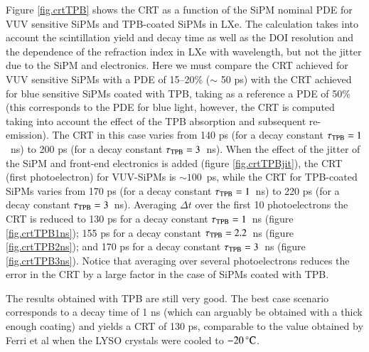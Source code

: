 \documentclass[review]{elsarticle}
\begin{document}
Figure \ref{fig.crtTPB} shows the CRT as a function of the
 SiPM nominal PDE for VUV sensitive SiPMs and TPB-coated SiPMs in LXe. 
 The calculation takes into account the scintillation yield and decay time as well as the DOI resolution and the dependence of the refraction index in LXe with wavelength, but not the jitter due to the SiPM and electronics. 
 Here we must compare the CRT achieved for VUV sensitive SiPMs with a PDE of 15--20\% ($\sim$ 50 ps) with the CRT achieved for blue sensitive SiPMs coated with TPB, taking as a reference a PDE of 50\% (this corresponds to the
 PDE for blue light,  however, the CRT is computed taking into account the effect of the TPB absorption and subsequent re-emission).  The CRT in this case varies from 140 ps (for a decay constant $\tau_{\rm{TPB}} = 1$~ns) to 
 200 ps (for a decay constant $\tau_{\rm{TPB}} = 3$~ns).  When the effect of the jitter of the SiPM and front-end electronics is added (figure \ref{fig.crtTPBjit}), the CRT (first photoelectron) for VUV-SiPMs is $\sim 100$~ps, while the CRT for TPB-coated SiPMs varies from
 170 ps (for a decay constant $\tau_{\rm{TPB}} = 1$~ns) to 
 220 ps (for a decay constant $\tau_{\rm{TPB}} = 3$~ns). Averaging $\Delta t$ over the first 10 photoelectrons 
 the CRT is reduced to 130 ps for a decay constant $\tau_{\rm{TPB}} = 1$~ns (figure \ref{fig.crtTPB1ns});
 155 ps for a decay constant $\tau_{\rm{TPB}} = 2.2$~ns (figure \ref{fig.crtTPB2ns});  and
 170 ps for a decay constant $\tau_{\rm{TPB}} = 3$~ns (figure \ref{fig.crtTPB3ns}). Notice that averaging over 
 several photoelectrons reduces the error in the CRT by a large factor in the case of SiPMs coated with TPB. 
 
 The results obtained with TPB are still very good. The best case scenario corresponds to a decay time of 1 ns
 (which can arguably be obtained with a thick enough coating) and yields a CRT of 130 ps, comparable to the value
 obtained by Ferri et al  \cite{LysoFBK}  when the LYSO crystals were cooled 
to $-20\,^{\circ}{\rm C}$.
    
\end{document}
